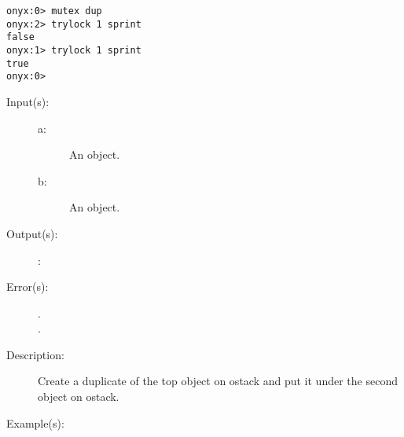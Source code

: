 \begin{description}
\begin{description}
\begin{verbatim}
onyx:0> mutex dup
onyx:2> trylock 1 sprint
false
onyx:1> trylock 1 sprint
true
onyx:0>
		\end{verbatim}
	\end{description}
\label{systemdict:tuck}
\item[{\onyxop{a b}{tuck}{b a b}}: ]
	\begin{description}\item[]
	\item[Input(s): ]
		\begin{description}\item[]
		\item[a: ]
			An object.
		\item[b: ]
			An object.
		\end{description}
	\item[Output(s): ]
		\begin{description}\item[]
		\item[: ]
		\end{description}
	\item[Error(s): ]
		\begin{description}\item[]
		\item[.]
		\item[.]
		\end{description}
	\item[Description: ]
		Create a duplicate of the top object on ostack and put it under
		the second object on ostack.
	\item[Example(s): ]\begin{verbatim}


\end{verbatim}
\end{description}
\end{description}
